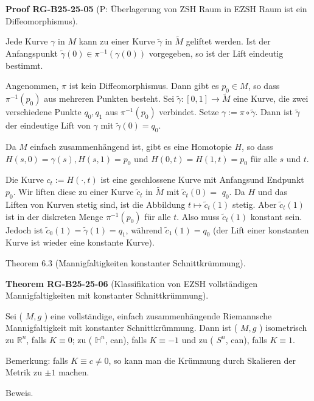 \documentclass[10pt, letterpaper]{article}
\newcommand{\CustomHeading}[3]{%
  \par\medskip\noindent%
  \textbf{#1 #2} \textnormal{(#3)}.\enskip%
}
\newenvironment{THEO}[2]{\begin{unitbox}\CustomHeading{Theorem}{#1}{#2}}{\end{unitbox}}
\newenvironment{PROOF}[2]{\begin{unitbox}\CustomHeading{Proof}{#1}{#2}}{\end{unitbox}}
\begin{document}
\begin{PROOF}{RG-B25-25-05}{P: Überlagerung von ZSH Raum in EZSH Raum ist ein Diffeomorphismus}
Jede Kurve $\gamma$ in $M$ kann zu einer Kurve $\tilde{\gamma}$ in $\tilde{M}$ geliftet werden. Ist der Anfangspunkt $\tilde{\gamma}(0) \in \pi^{-1}(\gamma(0))$ vorgegeben, so ist der Lift eindeutig bestimmt.

Angenommen, $\pi$ ist kein Diffeomorphismus. Dann gibt es $p_{0} \in M$, so dass $\pi^{-1}\left(p_{0}\right)$ aus mehreren Punkten besteht. Sei $\tilde{\gamma}:[0,1] \rightarrow \tilde{M}$ eine Kurve, die zwei verschiedene Punkte $q_{0}, q_{1}$ aus $\pi^{-1}\left(p_{0}\right)$ verbindet. Setze $\gamma:=\pi \circ \tilde{\gamma}$. Dann ist $\tilde{\gamma}$ der eindeutige Lift von $\gamma$ mit $\tilde{\gamma}(0)=q_{0}$.

Da $M$ einfach zusammenhängend ist, gibt es eine Homotopie $H$, so dass $H(s, 0)=\gamma(s), H(s, 1)=p_{0}$ und $H(0, t)=H(1, t)=p_{0}$ für alle $s$ und $t$.

Die Kurve $c_{t}:=H(\cdot, t)$ ist eine geschlossene Kurve mit Anfangsund Endpunkt $p_{0}$. Wir liften diese zu einer Kurve $\tilde{c}_{t}$ in $\tilde{M}$ mit $\tilde{c}_{t}(0)=$ $q_{0}$. Da $H$ und das Liften von Kurven stetig sind, ist die Abbildung $t \mapsto \tilde{c}_{t}(1)$ stetig. Aber $\tilde{c}_{t}(1)$ ist in der diskreten Menge $\pi^{-1}\left(p_{0}\right)$ für alle $t$. Also muss $\tilde{c}_{t}(1)$ konstant sein. Jedoch ist $\tilde{c}_{0}(1)=\tilde{\gamma}(1)=q_{1}$, während $\tilde{c}_{1}(1)=q_{0}$ (der Lift einer konstanten Kurve ist wieder eine konstante Kurve).
\end{PROOF}

Theorem 6.3 (Mannigfaltigkeiten konstanter Schnittkrümmung). 

\begin{THEO}{RG-B25-25-06}{Klassifikation von EZSH vollständigen Mannigfaltigkeiten mit konstanter Schnittkrümmung}
Sei ( $M, g$ ) eine vollständige, einfach zusammenhängende Riemannsche Mannigfaltigkeit mit konstanter Schnittkrümmung. Dann ist ( $M, g$ ) isometrisch zu $\mathbb{R}^{n}$, falls $K \equiv 0$; zu ( $\mathbb{H}^{n}$, can), falls $K \equiv-1$ und zu ( $S^{n}$, can), falls $K \equiv 1$.

Bemerkung: falls $K \equiv c \neq 0$, so kann man die Krümmung durch Skalieren der Metrik zu $\pm 1$ machen.
\end{THEO}

Beweis. 
\end{document}

